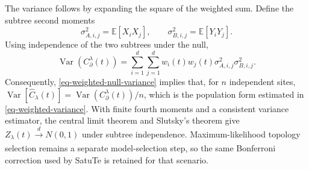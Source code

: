 The variance follows by expanding the square of the weighted sum. Define the subtree second moments
\[
\sigma^2_{A,i,j}
=\mathbb{E}[X_iX_j],
\qquad
\sigma^2_{B,i,j}
=\mathbb{E}[Y_iY_j].
\]
Using independence of the two subtrees under the null,
\begin{equation}
\operatorname{Var}\!\left(C_{\partial}^{\lambda}(t)\right)
=
\sum_{i=1}^{d}\sum_{j=1}^{d}
w_i(t)w_j(t)\sigma^2_{A,i,j}\sigma^2_{B,i,j}.
\label{eq-weighted-null-variance}
\end{equation}
Consequently, \cref{eq-weighted-null-variance} implies that, for \(n\) independent sites, \(\operatorname{Var}[\hat C_{\lambda}(t)] =
\operatorname{Var}(C_{\partial}^{\lambda}(t))/n\), which is the population form estimated in \cref{eq-weighted-variance}. With finite fourth moments and a consistent variance estimator, the central limit theorem and Slutsky's theorem give \(Z_{\lambda}(t)\xrightarrow[]{d}N(0,1)\) under subtree independence. Maximum-likelihood topology selection remains a separate model-selection step, so the same Bonferroni correction used by SatuTe is retained for that scenario.
